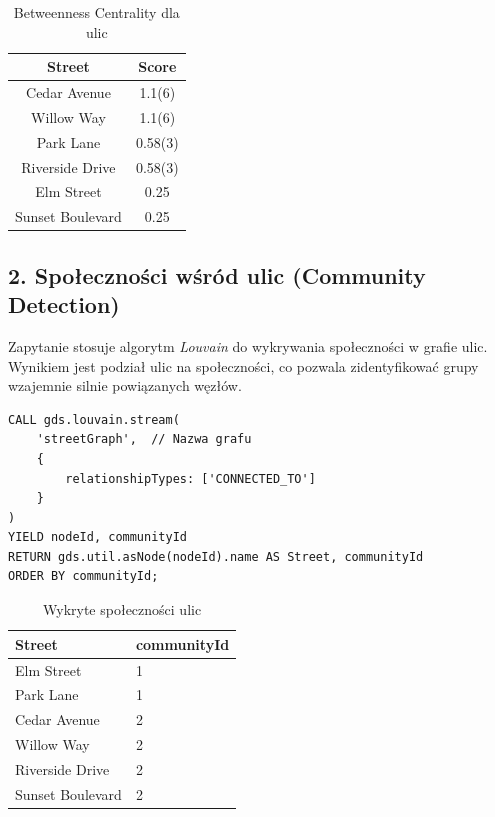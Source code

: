 \documentclass[a4paper,12pt]{article}
\begin{document}
\begin{table}[ht]
\centering
\begin{tabular}{|c|c|}
\hline
\textbf{Street} & \textbf{Score} \\
\hline
Cedar Avenue & 1.1(6) \\
Willow Way & 1.1(6) \\
Park Lane & 0.58(3) \\
Riverside Drive & 0.58(3) \\
Elm Street & 0.25 \\
Sunset Boulevard & 0.25 \\
\hline
\end{tabular}
\caption{Betweenness Centrality dla ulic}
\label{tab:street_scores}
\end{table}

\subsection*{2. Społeczności wśród ulic (Community Detection)}
Zapytanie stosuje algorytm \textit{Louvain} do wykrywania społeczności w grafie ulic. Wynikiem jest podział ulic na społeczności, co pozwala zidentyfikować grupy wzajemnie silnie powiązanych węzłów.
\begin{verbatim}
CALL gds.louvain.stream(
    'streetGraph',  // Nazwa grafu
    {
        relationshipTypes: ['CONNECTED_TO']
    }
)
YIELD nodeId, communityId
RETURN gds.util.asNode(nodeId).name AS Street, communityId
ORDER BY communityId;
\end{verbatim}

\begin{table}[h!]
\centering
\begin{tabular}{|l|l|}
\hline
\textbf{Street}         & \textbf{communityId} \\ \hline
Elm Street              & 1                    \\ \hline
Park Lane               & 1                    \\ \hline
Cedar Avenue            & 2                   \\ \hline
Willow Way              & 2                    \\ \hline
Riverside Drive         & 2                    \\ \hline
Sunset Boulevard        & 2                    \\ \hline
\end{tabular}
\caption{Wykryte społeczności ulic}
\label{tab:streets_community}
\end{table}
\end{document}
